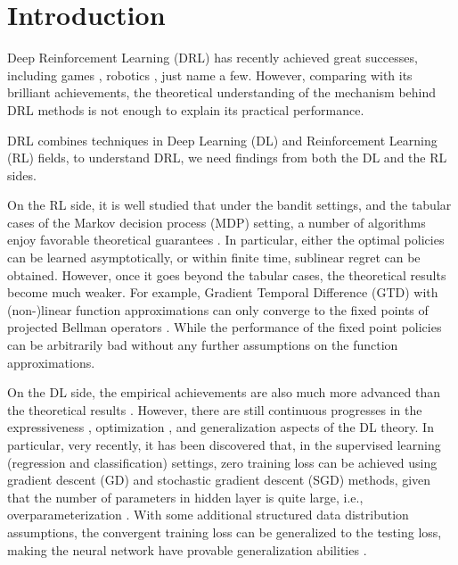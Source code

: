 \section{Introduction}
\label{introduction}

Deep Reinforcement Learning (DRL) has recently achieved great successes, including games \citep{silver2016masteringA,silver2017masteringB,moravvcik2017deepstack,mnih2015human}, robotics \citep{lillicrap2015continuous,levine2016end}, just name a few. However, comparing with its brilliant achievements, the theoretical understanding of the mechanism behind DRL methods is not enough to explain its practical performance. 

DRL combines techniques in Deep Learning (DL) and Reinforcement Learning (RL) fields, to understand DRL, we need findings from both the DL and the RL sides.

On the RL side, it is well studied that under the bandit settings, and the tabular cases of the Markov decision process (MDP) setting, a number of algorithms enjoy favorable theoretical guarantees \citep{bubeck2012regret,sutton2018reinforcement}. In particular, either the optimal policies can be learned asymptotically, or within finite time, sublinear regret can be obtained. However, once it goes beyond the tabular cases, the theoretical results become much weaker. For example, Gradient Temporal Difference (GTD) with (non-)linear function approximations can only converge to the fixed points of projected Bellman operators \citep{sutton2009fast,sutton2009convergent,bhatnagar2009convergent}. While the performance of the fixed point policies can be arbitrarily bad without any further assumptions on the function approximations.

On the DL side, the empirical achievements are also much more advanced than the  theoretical results \citep{goodfellow2016deep,zhang2016understanding}. However, there are still continuous progresses in the expressiveness \citep{cybenko1989approximation,raghu2017expressive}, optimization \citep{kawaguchi2016deep,li2017convergence,li2018learning,du2018gradientA,du2018gradientB,allen2018convergenceA,allen2018convergenceB}, and generalization \cite{neyshabur2017exploring,allen2018learning} aspects of the DL theory. In particular, very recently, it has been discovered that, in the supervised learning (regression and classification) settings, zero training loss can be achieved using gradient descent (GD) and stochastic gradient descent (SGD) methods, given that the number of parameters in hidden layer is quite large, i.e., overparameterization \citep{li2018learning,du2018gradientA,du2018gradientB,allen2018convergenceA,allen2018convergenceB}. With some additional structured data distribution assumptions, the convergent training loss can be generalized to the testing loss, making the neural network have provable generalization abilities \citep{li2018learning,allen2018learning}.

